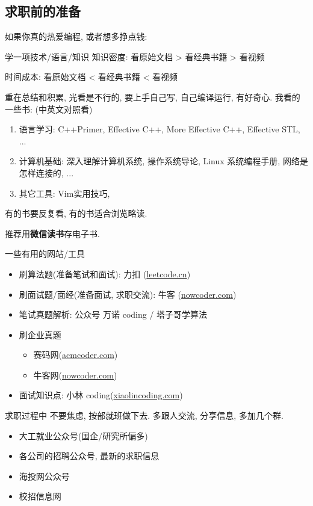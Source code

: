 \documentclass{ctexbeamer}
\begin{document}
\subsection{求职前的准备}
\begin{frame}
	如果你真的热爱编程, 或者想多挣点钱: 
	\begin{alertblock}{学一项技术/语言/知识}
		知识密度: 看原始文档 > 看经典书籍 > 看视频

		时间成本: 看原始文档 < 看经典书籍 < 看视频
	\end{alertblock}
	重在总结和积累, 光看是不行的, 要上手自己写, 自己编译运行, 有好奇心.
	我看的一些书: (中英文对照看)
	\begin{enumerate}
		\item 语言学习: C++Primer, Effective C++, More Effective C++, Effective STL, ...
		\item 计算机基础: 深入理解计算机系统, 操作系统导论, Linux 系统编程手册, 网络是怎样连接的, ...
		\item 其它工具: Vim实用技巧,
	\end{enumerate}
	有的书要反复看, 有的书适合浏览略读.

	推荐用\textbf{微信读书}存电子书.
\end{frame}


\begin{frame}{一些有用的网站/工具}
	\begin{itemize}
		\item 刷算法题(准备笔试和面试): 力扣 (\hyperref[https://leetcode.cn]{leetcode.cn})
		\item 刷面试题/面经(准备面试, 求职交流): 牛客 (\hyperref[https://nowcoder.com]{nowcoder.com})
		\item 笔试真题解析: 公众号 万诺 coding / 塔子哥学算法
		\item 刷企业真题
		      \begin{itemize}
			      \item 赛码网(\hyperref[https://acmcoder.com]{acmcoder.com})
			      \item 牛客网(\hyperref[https://nowcoder.com]{nowcoder.com})
		      \end{itemize}
		\item 面试知识点: 小林 coding(\hyperref[https://xiaolincoding.com]{xiaolincoding.com})
	\end{itemize}
\end{frame}



\begin{frame}{求职过程中}
	不要焦虑, 按部就班做下去.
	多跟人交流, 分享信息, 多加几个群.
	\begin{itemize}
		\item 大工就业公众号(国企/研究所偏多)
		\item 各公司的招聘公众号, 最新的求职信息
		\item 海投网公众号
		\item 校招信息网
	\end{itemize}
\end{frame}
\end{document}
